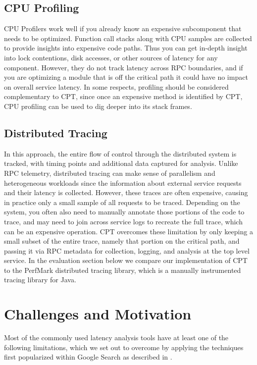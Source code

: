 \documentclass[11pt, twoside, twocolumn]{extarticle}
\begin{document}
\subsection{CPU Profiling}
CPU Profilers work well if you already know an expensive subcomponent that needs to be optimized.  Function call stacks along with CPU samples are collected to provide insights into expensive code paths.  Thus you can get in-depth insight into lock contentions, disk accesses, or other sources of latency for any component.  However, they do not track latency across RPC boundaries, and if you are optimizing a module that is off the critical path it could have no impact on overall service latency.  In some respects, profiling should be considered complementary to CPT, since once an expensive method is identified by CPT, CPU profiling can be used to dig deeper into its stack frames.

\subsection{Distributed Tracing}
In this approach, the entire flow of control through the distributed system is tracked, with timing points and additional data captured for analysis\cite{36356}.  Unlike RPC telemetry, distributed tracing can make sense of parallelism and heterogeneous workloads since the information about external service requests and their latency is collected.  However, these traces are often expensive, causing in practice only a small sample of all requests to be traced.  Depending on the system, you often also need to manually annotate those portions of the code to trace, and may need to join across service logs to recreate the full trace, which can be an expensive operation.  CPT overcomes these limitation by only keeping a small subset of the entire trace, namely that portion on the critical path, and passing it via RPC metadata for collection, logging, and analysis at the top level service. In the evaluation section below we compare our implementation of CPT to the PerfMark distributed tracing library\cite{PerfMark}, which is a manually instrumented tracing library for Java. 

\section{Challenges and Motivation}

Most of the commonly used latency analysis tools have at least one of the following limitations, which we set out to overcome by applying the techniques first popularized within Google Search as described in \cite{10.1145/3526967}.
\end{document}

